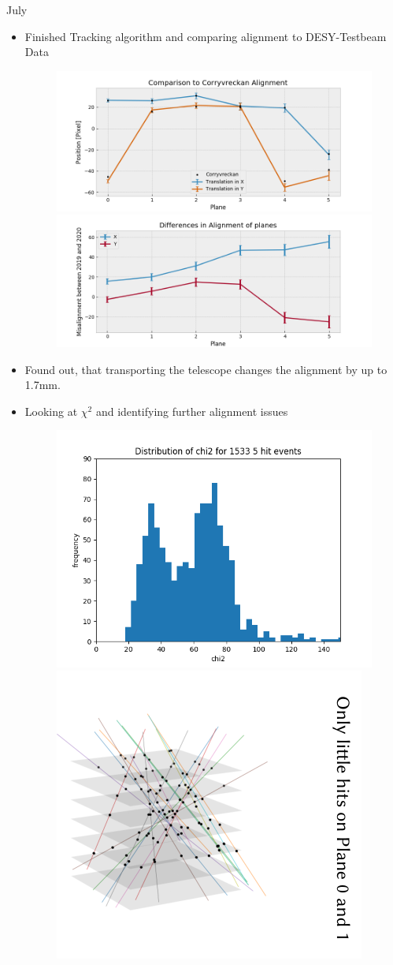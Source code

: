 \documentclass{beamer}
\begin{document}
\begin{frame}{July}
    \begin{itemize}
	    \footnotesize
	\item Finished Tracking algorithm and comparing 
	    alignment to DESY-Testbeam Data
	    \begin{figure}[H]
		\centering
		\includegraphics[width=.49\textwidth]{Corry.png}
		\includegraphics[width=.49\textwidth]{Misalignment.png}
	    \end{figure}
	\item Found out, that transporting the telescope changes the alignment
	    by up to 1.7mm.
	\item Looking at \( \chi^2 \) and identifying further alignment issues
	    \begin{figure}[H]
		\centering
		\includegraphics[width=.4\textwidth]{MauriceChi2.png}
		\includegraphics[width=.3\textwidth]{MauriceMisalign.png}
	    \end{figure}
    \end{itemize}
\end{frame}
\end{document}
